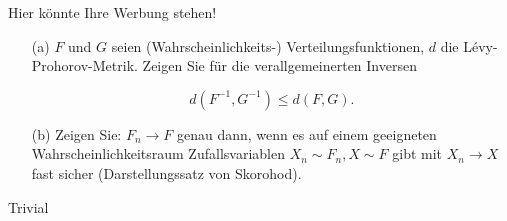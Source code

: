 \begin{exercise}

Hier könnte Ihre Werbung stehen!

\begin{itemize}
    \item[(a)] $F$ und $G$ seien (Wahrscheinlichkeits-) Verteilungsfunktionen, $d$ die Lévy-Prohorov-Metrik. Zeigen Sie für die verallgemeinerten Inversen

    \begin{equation*}
      d(F^{-1},G^{-1}) \leq d(F,G).
    \end{equation*}

    \item[(b)] Zeigen Sie: $F_n \longrightarrow F$ genau dann, wenn es auf einem geeigneten Wahrscheinlichkeitsraum Zufallsvariablen $X_n \sim F_n, X \sim F$ gibt mit $X_n \rightarrow X$ fast sicher (Darstellungssatz von Skorohod).
\end{itemize}

\end{exercise}

\begin{solution}

Trivial

\end{solution}
